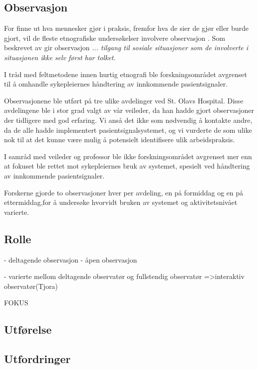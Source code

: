 \subsection{Observasjon}
\label{section:observasjon} 

For finne ut hva mennesker gjør i praksis, fremfor hva de sier de gjør eller burde gjort, vil de fleste etnografiske undersøkelser involvere observasjon \citep{Oates, Blomberg93, Tjora}. Som beskrevet av \citet{Tjora} gir observasjon \textit{... tilgang til sosiale situasjoner som de involverte i situasjonen ikke selv først har tolket}.

\noindent
I tråd med feltmetodene innen hurtig etnografi ble forskningsområdet avgrenset til å omhandle sykepleiernes håndtering av innkommende pasientsignaler.


Observasjonene ble utført på tre ulike avdelinger ved St. Olavs Hospital. Disse avdelingene ble i stor grad valgt av vår veileder, da han hadde gjort observasjoner der tidligere med god erfaring. Vi anså det ikke som nødvendig å kontakte andre, da de alle hadde implementert pasientsignalsystemet, og vi vurderte de som ulike nok til at det kunne være mulig å potensielt identifisere ulik arbeidspraksis.

I samråd med veileder og professor ble ikke forskningsområdet avgrenset mer enn at fokuset ble rettet mot sykepleiernes bruk av systemet, spesielt ved håndtering av innkommende pasientsignaler.


Forskerne gjorde to observasjoner hver per avdeling, en på formiddag og en på ettermiddag,for å undersøke hvorvidt bruken av systemet og aktivitetsnivået varierte.



\subsection{Rolle}
- deltagende observasjon
- åpen observasjon

- varierte mellom deltagende observatør og fullstendig observatør =>interaktiv observatør(Tjora)


FOKUS


\subsection{Utførelse}

\subsection{Utfordringer}
